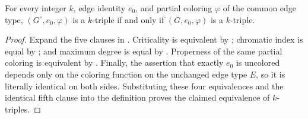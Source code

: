 \begin{lemma}
For every integer $k$, edge identity $e_0$, and partial coloring $\varphi$
of the common edge type, $(G^{\circ},e_0,\varphi)$ is a $k$-triple if and
only if $(G,e_0,\varphi)$ is a $k$-triple.
\end{lemma}
\begin{proof}
Expand the five clauses in .  Criticality is equivalent by
; chromatic index is equal by
; and maximum degree is equal by
.  Properness of the same partial
coloring is equivalent by .  Finally,
the assertion that exactly $e_0$ is uncolored depends only on the coloring
function on the unchanged edge type $E$, so it is literally identical on
both sides.  Substituting these four equivalences and the identical fifth
clause into the definition proves the claimed equivalence of $k$-triples.
\end{proof}
